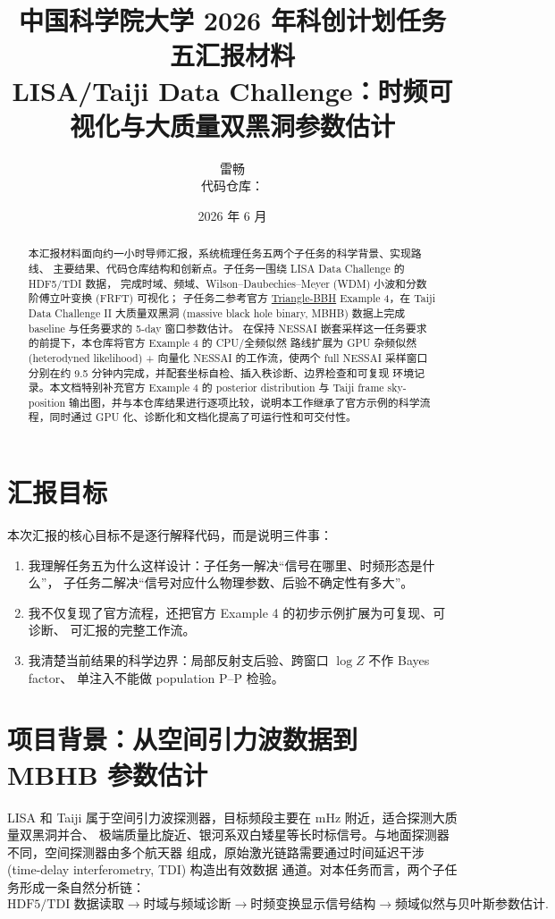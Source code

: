 \documentclass[11pt,a4paper]{ctexart}
\title{\bfseries 中国科学院大学 2026 年科创计划任务五汇报材料\\
\large LISA/Taiji Data Challenge：时频可视化与大质量双黑洞参数估计}
\author{雷畅\\代码仓库：\repo}
\date{2026 年 6 月}
\newcommand{\official}{\href{https://github.com/TriangleDataCenter/Triangle-BBH}{Triangle-BBH}}
\begin{document}
\maketitle

\begin{abstract}
本汇报材料面向约一小时导师汇报，系统梳理任务五两个子任务的科学背景、实现路线、
主要结果、代码仓库结构和创新点。子任务一围绕 LISA Data Challenge 的 HDF5/TDI 数据，
完成时域、频域、Wilson--Daubechies--Meyer (WDM) 小波和分数阶傅立叶变换 (FRFT) 可视化；
子任务二参考官方 \official{} Example 4，在 Taiji Data Challenge II 大质量双黑洞
(massive black hole binary, MBHB) 数据上完成 baseline 与任务要求的 5-day 窗口参数估计。
在保持 NESSAI 嵌套采样这一任务要求的前提下，本仓库将官方 Example 4 的 CPU/全频似然
路线扩展为 GPU 杂频似然 (heterodyned likelihood) + 向量化 NESSAI 的工作流，使两个 full
NESSAI 采样窗口分别在约 9.5 分钟内完成，并配套坐标自检、插入秩诊断、边界检查和可复现
环境记录。本文档特别补充官方 Example 4 的 posterior distribution 与 Taiji frame sky-position
输出图，并与本仓库结果进行逐项比较，说明本工作继承了官方示例的科学流程，同时通过
GPU 化、诊断化和文档化提高了可运行性和可交付性。
\end{abstract}

\tableofcontents
\newpage

\section{汇报目标}

本次汇报的核心目标不是逐行解释代码，而是说明三件事：
\begin{enumerate}
  \item 我理解任务五为什么这样设计：子任务一解决“信号在哪里、时频形态是什么”，
  子任务二解决“信号对应什么物理参数、后验不确定性有多大”。
  \item 我不仅复现了官方流程，还把官方 Example 4 的初步示例扩展为可复现、可诊断、
  可汇报的完整工作流。
  \item 我清楚当前结果的科学边界：局部反射支后验、跨窗口 \(\log Z\) 不作 Bayes factor、
  单注入不能做 population P--P 检验。
\end{enumerate}

\section{项目背景：从空间引力波数据到 MBHB 参数估计}

LISA 和 Taiji 属于空间引力波探测器，目标频段主要在 mHz 附近，适合探测大质量双黑洞并合、
极端质量比旋近、银河系双白矮星等长时标信号。与地面探测器不同，空间探测器由多个航天器
组成，原始激光链路需要通过时间延迟干涉 (time-delay interferometry, TDI) 构造出有效数据
通道。对本任务而言，两个子任务形成一条自然分析链：
\[
\text{HDF5/TDI 数据读取}
\rightarrow
\text{时域与频域诊断}
\rightarrow
\text{时频变换显示信号结构}
\rightarrow
\text{频域似然与贝叶斯参数估计}.
\]
\end{document}
